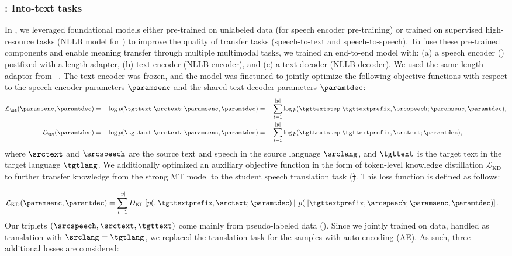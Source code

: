 \subsubsection{\xt: Into-text tasks}\label{sec:offline:x2t}
In \mfourt, we leveraged foundational models either pre-trained on unlabeled data (\wvbert for speech encoder pre-training) or trained on supervised high-resource tasks (NLLB model for \mt) to improve the quality of transfer tasks (speech-to-text and speech-to-speech). 
To fuse these pre-trained components and enable meaning transfer through multiple multimodal tasks, we trained an end-to-end model with: 
(a) a speech encoder (\wvbert) postfixed with a length adapter, 
(b) text encoder (NLLB encoder), and 
(c) a text decoder (NLLB decoder). 
We used the same length adaptor from ~\citet{SeamlessM4TArXiv}.
The text encoder was frozen, and the model was finetuned to jointly optimize the following objective functions with respect to the speech encoder parameters $\paramsenc$ and the shared text decoder parameters $\paramtdec$:
\begin{align}
    \mathcal L_{\text{\st}}(\paramsenc, \paramtdec) 
    &= -\log p(\tgttext | \srctext; \paramsenc, \paramtdec)
    =- \sum_{t=1}^{|y|} \log p(\tgttextstep | \tgttextprefix, \srcspeech; \paramsenc, \paramtdec),\\
    \mathcal L_{\text{\mt}}(\paramtdec) 
    &= -\log p(\tgttext | \srctext; \paramsenc, \paramtdec)
    = - \sum_{t=1}^{|y|} \log p(\tgttextstep | \tgttextprefix, \srctext; \paramtdec),
\end{align}
where $\srctext$ and $\srcspeech$ are the source text and speech in the source language $\srclang$, and $\tgttext$ is the target text in the target language $\tgtlang$.
We additionally optimized an auxiliary objective function in the form of token-level knowledge distillation $\mathcal{L}_{\text{KD}}$ to further transfer knowledge from the strong MT model to the student speech translation task (\st). This loss function is defined as follows:

\begin{align}
    \mathcal{L}_{\text{KD}}(\paramsenc, \paramtdec) & = \sum_{t=1}^{|y|} D_\text{KL}
    \left[
    p(. |\tgttextprefix, \srctext; \paramtdec)\, \| \,
    p(. |\tgttextprefix, \srcspeech; \paramsenc, \paramtdec)
\right].
\end{align}
Our triplets $(\srcspeech, \srctext, \tgttext)$ come mainly from pseudo-labeled \asr data (). Since we jointly trained on \asr data, handled as translation with $\srclang=\tgtlang$, we replaced the translation task for the \asr samples with auto-encoding (AE). As such, three additional losses are considered:

